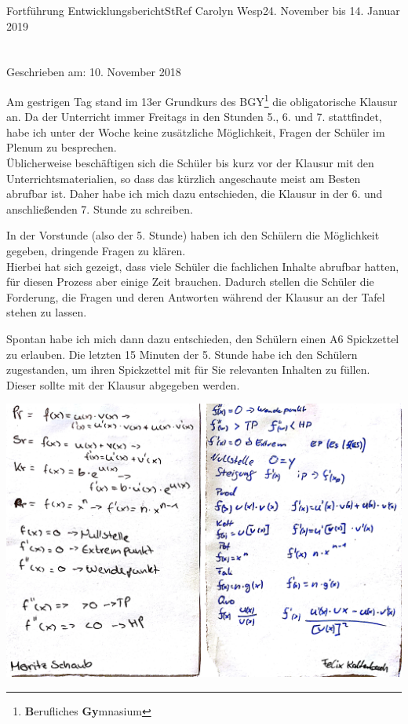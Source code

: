 \documentclass[oneside,openany,headings=optiontotoc,11pt,numbers=noenddot]{article}
\begin{document}
\begin{worksheet}{Fortführung Entwicklungsbericht}{StRef\grq{} Carolyn Wesp}{24. November bis 14. Januar 2019}
		\section*{}
		\tiny{Geschrieben am: 10. November 2018}\small\\
		\par\noindent
		Am gestrigen Tag stand im 13er Grundkurs des BGY\footnote{\textbf{B}erufliches \textbf{Gy}mnasium} die obligatorische Klausur an. Da der Unterricht immer Freitags in den Stunden 5., 6. und 7. stattfindet, habe ich unter der Woche keine zusätzliche Möglichkeit, Fragen der Schüler im Plenum zu besprechen.\\
		Üblicherweise beschäftigen sich die Schüler bis kurz vor der Klausur mit den Unterrichtsmaterialien, so dass das kürzlich angeschaute meist am Besten abrufbar ist. Daher habe ich mich dazu entschieden, die Klausur in der 6. und anschließenden 7. Stunde zu schreiben.\\
		\par\noindent		
		In der Vorstunde (also der 5. Stunde) haben ich den Schülern die Möglichkeit gegeben, dringende Fragen zu klären.\\
		Hierbei hat sich gezeigt, dass viele Schüler die fachlichen Inhalte abrufbar hatten, für diesen Prozess aber einige Zeit brauchen. Dadurch stellen die Schüler die Forderung, die Fragen und deren Antworten während der Klausur an der Tafel stehen zu lassen.\\
		\par\noindent
		Spontan habe ich mich dann dazu entschieden, den Schülern einen A6 \grq{}Spickzettel\grq{} zu erlauben. Die letzten 15 Minuten der 5. Stunde habe ich den Schülern zugestanden, um ihren \grq{}Spickzettel\grq{} mit für Sie relevanten Inhalten zu füllen. Dieser sollte mit der Klausur abgegeben werden.\\
		\par
		\includegraphics[width=\textwidth]{SpZ1.jpg}\\

\end{worksheet}
\end{document}
